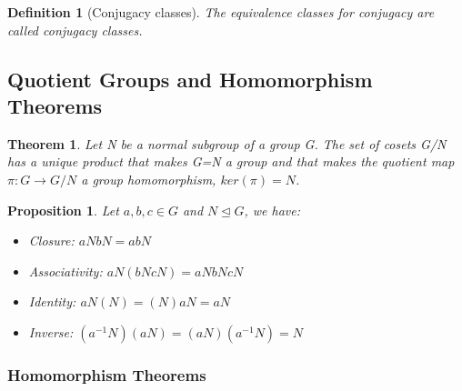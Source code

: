 \documentclass[12pt]{article}
\newtheorem{definition}{Definition}[subsection]
\newtheorem{theorem}{Theorem}[subsection]
\newtheorem{proposition}{Proposition}[subsection]
\begin{document}
        \begin{definition}[Conjugacy classes]
            The equivalence classes for conjugacy are called conjugacy classes.
        \end{definition}
    \subsection{Quotient Groups and Homomorphism Theorems}

    \begin{theorem}
        Let N be a normal subgroup of a group G. The set of cosets G/N has a unique product that makes G=N a group and that makes the quotient map $\pi : G  \rightarrow G/N$ a group homomorphism, $ker(\pi) = N$.
    \end{theorem}
    
    \begin{proposition}
    	Let $a, b,c \in G$ and $N \unlhd G$, we have:
    		\begin{itemize}
    			\item Closure: $aNbN = abN$
    			\item Associativity: $aN(bNcN) = aNbNcN$
    			\item Identity: $aN(N) = (N)aN = aN$
    			\item Inverse: $(a^{-1}N)(aN) = (aN)(a^{-1}N) = N$
    		\end{itemize}
    \end{proposition}

    \subsubsection{Homomorphism Theorems}
    
\end{document}
